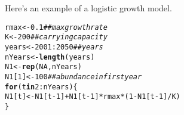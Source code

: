 \documentclass[12pt]{article}\usepackage[]{graphicx}\usepackage[]{xcolor}
\makeatletter
\newcommand{\hlnum}[1]{\textcolor[rgb]{0.686,0.059,0.569}{#1}}%
\newcommand{\hlcom}[1]{\textcolor[rgb]{0.678,0.584,0.686}{\textit{#1}}}%
\newcommand{\hlopt}[1]{\textcolor[rgb]{0,0,0}{#1}}%
\newcommand{\hldef}[1]{\textcolor[rgb]{0.345,0.345,0.345}{#1}}%
\newcommand{\hlkwa}[1]{\textcolor[rgb]{0.161,0.373,0.58}{\textbf{#1}}}%
\newcommand{\hlkwb}[1]{\textcolor[rgb]{0.69,0.353,0.396}{#1}}%
\newcommand{\hlkwd}[1]{\textcolor[rgb]{0.737,0.353,0.396}{\textbf{#1}}}%
\newenvironment{kframe}{%
 \def\at@end@of@kframe{}%
 \ifinner\ifhmode%
  \def\at@end@of@kframe{\end{minipage}}%
  \begin{minipage}{\columnwidth}%
 \fi\fi%
 \def\FrameCommand##1{\hskip\@totalleftmargin \hskip-\fboxsep
 \colorbox{shadecolor}{##1}\hskip-\fboxsep
     \hskip-\linewidth \hskip-\@totalleftmargin \hskip\columnwidth}%
 \MakeFramed {\advance\hsize-\width
   \@totalleftmargin\z@ \linewidth\hsize
   \@setminipage}}%
 {\par\unskip\endMakeFramed%
 \at@end@of@kframe}
\newenvironment{knitrout}{}{} %
\makeatother
\begin{document}
Here's an example of a logistic growth model.
\begin{knitrout}\small
{}\color{fgcolor}\begin{kframe}
\begin{alltt}
\hldef{rmax} \hlkwb{<-} \hlnum{0.1}              \hlcom{## max growth rate}
\hldef{K} \hlkwb{<-} \hlnum{200}                 \hlcom{## carrying capacity}
\hldef{years} \hlkwb{<-} \hlnum{2001}\hlopt{:}\hlnum{2050}       \hlcom{## years}
\hldef{nYears} \hlkwb{<-} \hlkwd{length}\hldef{(years)}
\hldef{N1} \hlkwb{<-} \hlkwd{rep}\hldef{(}\hlnum{NA}\hldef{, nYears)}
\hldef{N1[}\hlnum{1}\hldef{]} \hlkwb{<-} \hlnum{100}             \hlcom{## abundance in first year}
\hlkwa{for}\hldef{(t} \hlkwa{in} \hlnum{2}\hlopt{:}\hldef{nYears) \{}
    \hldef{N1[t]} \hlkwb{<-} \hldef{N1[t}\hlopt{-}\hlnum{1}\hldef{]} \hlopt{+} \hldef{N1[t}\hlopt{-}\hlnum{1}\hldef{]}\hlopt{*}\hldef{rmax}\hlopt{*}\hldef{(}\hlnum{1} \hlopt{-} \hldef{N1[t}\hlopt{-}\hlnum{1}\hldef{]}\hlopt{/}\hldef{K)}
\hldef{\}}
\end{alltt}
\end{kframe}
\end{knitrout}



\end{document}
